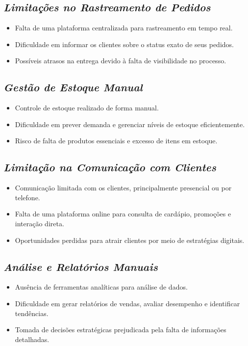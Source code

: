 \subsection*{\textit{Limitações no Rastreamento de Pedidos}}

\begin{itemize}
    \item Falta de uma plataforma centralizada para rastreamento em tempo real.
    \item Dificuldade em informar os clientes sobre o status exato de seus pedidos.
    \item Possíveis atrasos na entrega devido à falta de visibilidade no processo.
\end{itemize}

\subsection*{\textit{Gestão de Estoque Manual}}

\begin{itemize}
    \item Controle de estoque realizado de forma manual.
    \item Dificuldade em prever demanda e gerenciar níveis de estoque eficientemente.
    \item Risco de falta de produtos essenciais e excesso de itens em estoque.
\end{itemize}

\subsection*{\textit{Limitação na Comunicação com Clientes}}

\begin{itemize}
    \item Comunicação limitada com os clientes, principalmente presencial ou por telefone.
    \item Falta de uma plataforma online para consulta de cardápio, promoções e interação direta.
    \item Oportunidades perdidas para atrair clientes por meio de estratégias digitais.
\end{itemize}

\subsection*{\textit{Análise e Relatórios Manuais}}

\begin{itemize}
    \item Ausência de ferramentas analíticas para análise de dados.
    \item Dificuldade em gerar relatórios de vendas, avaliar desempenho e identificar tendências.
    \item Tomada de decisões estratégicas prejudicada pela falta de informações detalhadas.
\end{itemize}

